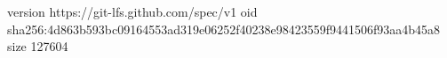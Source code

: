 version https://git-lfs.github.com/spec/v1
oid sha256:4d863b593bc09164553ad319e06252f40238e98423559f9441506f93aa4b45a8
size 127604
